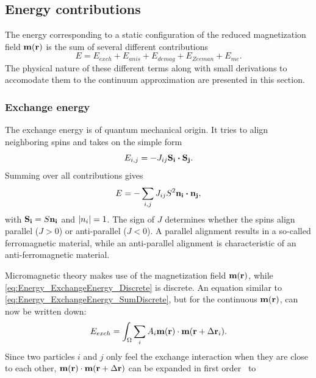 \documentclass[11pt,a4paper,english]{article}
\begin{document}
\subsection{Energy contributions}
The energy corresponding to a static configuration of the reduced magnetization field $\vb{m}(\vb{r})$ is the sum of several different contributions
\begin{equation}
    E = E_{exch} + E_{anis} + E_{demag} + E_{Zeeman} + E_{me} \mathrm{.} \label{eq:Energy_Terms}
\end{equation}
The physical nature of these different terms along with small derivations to accomodate them to the continuum approximation are presented in this section.
\subsubsection{Exchange energy}
\label{par:Energy_Exchange}
The exchange energy is of quantum mechanical origin. It tries to align neighboring spins and takes on the simple form
\begin{equation}
    E_{i,j} = -J_{ij} \vb{S_i} \vdot \vb{S_j} \mathrm{.}
    \label{eq:Energy_ExchangeEnergy_Discrete}
\end{equation}
Summing over all contributions gives
\begin{equation}
    E = -\sum_{i,j} J_{ij} S^2 \vb{n_i} \vdot \vb{n_j} \mathrm{,}
    \label{eq:Energy_ExchangeEnergy_SumDiscrete}
\end{equation}
with $\vb{S_i} = S \vb{n_i}$ and $\abs{n_i} = 1$. 
The sign of $J$ determines whether the spins align parallel ($J>0$) or anti-parallel ($J<0$). A parallel alignment results in a so-called ferromagnetic material, while an anti-parallel alignment is characteristic of an anti-ferromagnetic material. \par
Micromagnetic theory makes use of the magnetization field $\vb{m}(\vb{r})$, while \cref{eq:Energy_ExchangeEnergy_Discrete} is discrete. An equation similar to \cref{eq:Energy_ExchangeEnergy_SumDiscrete}, but for the continuous $\vb{m}(\vb{r})$, can now be written down:
\begin{equation}
    E_{exch} = \int_\Omega \sum_i A_i \vb{m}(\vb{r}) \cdot \vb{m}(\vb{r} + \Delta\vb{r}_i) \mathrm{.} \label{eq:Energy_ExchangeEnergy_SumContinuous}
\end{equation}
Since two particles $i$ and $j$ only feel the exchange interaction when they are close to each other, $\vb{m}(\vb{r}) \cdot \vb{m}(\vb{r} + \Delta\vb{r})$ can be expanded in first order~\cite{abert2013discrete} to
\end{document}
